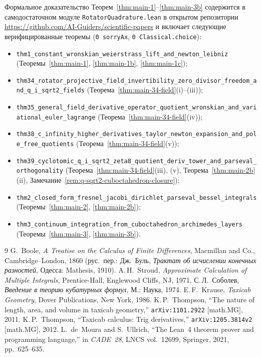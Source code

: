 \documentclass[11pt,a4paper]{article}
\theoremstyle{plain}
\theoremstyle{definition}
\begin{document}
Формальное доказательство Теорем~\ref{thm:main-1}--\ref{thm:main-3b} содержится в самодостаточном модуле \texttt{RotatorQuadrature.lean} в открытом репозитории \url{https://github.com/AI-Guiders/scientific-papers} и включает следующие верифицированные теоремы (\texttt{0 sorryAx}, \texttt{0 Classical.choice}):
\begin{itemize}[leftmargin=*]
\item \texttt{thm1\_constant\_wronskian\_weierstrass\_lift\_and\_newton\_leibniz} (Теоремы~\ref{thm:main-1}, \ref{thm:main-1b}, \ref{thm:main-1c});
\item \texttt{thm34\_rotator\_projective\_field\_invertibility\_zero\_divisor\_freedom\_and\_q\_i\_sqrt2\_fields} (Теорема~\ref{thm:main-34-field}(i)--(iii));
\item \texttt{thm35\_general\_field\_derivative\_operator\_quotient\_wronskian\_and\_variational\_euler\_lagrange} (Теорема~\ref{thm:main-34-field}(iv));
\item \texttt{thm38\_c\_infinity\_higher\_derivatives\_taylor\_newton\_expansion\_and\_pole\_free\_quotients} (Теорема~\ref{thm:main-34-field}(v));
\item \texttt{thm39\_cyclotomic\_q\_i\_sqrt2\_zeta8\_quotient\_deriv\_tower\_and\_parseval\_orthogonality} (Теорема~\ref{thm:main-34-field}(iii), (v), Теорема~\ref{thm:main-2b}(ii), Замечание~\ref{rem:q-sqrt2-cuboctahedron-closure});
\item \texttt{thm2\_closed\_form\_fresnel\_jacobi\_dirichlet\_parseval\_bessel\_integrals} (Теоремы~\ref{thm:main-2}, \ref{thm:main-2b});
\item \texttt{thm3\_continuum\_integration\_from\_cuboctahedron\_archimedes\_layers} (Теоремы~\ref{thm:main-3}, \ref{thm:main-3b}).
\end{itemize}

\begin{thebibliography}{9}
G.~Boole, \emph{A Treatise on the Calculus of Finite Differences}, Macmillan and Co., Cambridge--London, 1860 (рус.\ пер.: Дж.~Буль, \emph{Трактат об исчислении конечных разностей}, Одесса: Mathesis, 1910).
A.\,H.~Stroud, \emph{Approximate Calculation of Multiple Integrals}, Prentice-Hall, Englewood Cliffs, NJ, 1971.
С.\,Л.~Соболев, \emph{Введение в теорию кубатурных формул}, М.: Наука, 1974.
E.\,F.~Krause, \emph{Taxicab Geometry}, Dover Publications, New York, 1986.
K.\,P.~Thompson, ``The nature of length, area, and volume in taxicab geometry,'' \texttt{arXiv:1101.2922} [math.MG], 2011.
K.\,P.~Thompson, ``Taxicab calculus: Trig derivatives,'' \texttt{arXiv:1205.3814v2} [math.MG], 2012.
L.~de~Moura and S.~Ullrich, ``The Lean~4 theorem prover and programming language,'' in \emph{CADE~28}, LNCS vol.~12699, Springer, 2021, pp.~625--635.
\end{thebibliography}
\end{document}
